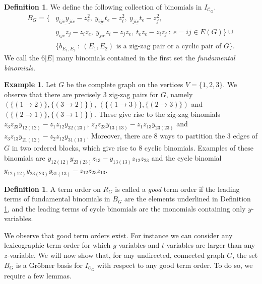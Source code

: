 \documentclass[11pt]{article}
\theoremstyle{definition}
\newtheorem{defi}[theo]{Definition}
\newtheorem{example}[theo]{Example}
\numberwithin{equation}{section}
\begin{document}
\begin{defi}\label{def: basis}
	We define the following collection of binomials in $I_{\mathcal{C}_G}$.
	\begin{align*}
		B_G=\{& \underline{y_{ije}y_{jie}}-z_e^2,~ \underline{y_{ije}t_{e}}-z_i^2,~  \underline{y_{jie}t_{e}}-z_j^2,\\
		& \underline{y_{ije}z_j} - z_iz_e,~ \underline{y_{jie}z_i} - z_jz_e,~ \underline{t_{e}z_e} - z_iz_j ~:~ e=ij\in E(G)\} \cup\\
		& \{b_{E_1,E_2} ~ : ~ (E_1,E_2) \text{ is a zig-zag pair or a cyclic pair of $G$}\}.
	\end{align*}
	We call the $6|E|$ many binomials contained in the first set the \emph{fundamental binomials}.
\end{defi}
\begin{example}
    Let $G$ be the complete graph on the vertices $V=\{1,2,3\}$. We observe that there are precisely $3$ zig-zag pairs for $G$, namely $(\{(1\to 2)\},\{(3\to 2)\})$, $(\{(1\to 3)\},\{(2\to 3)\})$ and $(\{(2\to 1)\},\{(3\to 1)\})$. These give rise to the zig-zag binomials $z_{3}z_{23}y_{12(12)}-z_{1}z_{12}y_{32(23)}$, $z_{2}z_{23}y_{13(13)}-z_{1}z_{13}y_{23(23)}$ and $z_{3}z_{13}y_{21(12)}-z_{2}z_{12}y_{31(13)}$. Moreover, there are 8 ways to partition the $3$ edges of $G$ in two ordered blocks, which give rise to $8$ cyclic binomials. Examples of these binomials are $y_{12(12)}y_{23(23)}z_{13}-y_{13(13)}z_{12}z_{23}$ and the cycle binomial $y_{12(12)}y_{23(23)}y_{31(13)}-z_{12}z_{23}z_{13}$.
\end{example}
\begin{defi}\label{def : good}
    A term order on $R_G$ is called a \emph{good} term order if the leading terms of fundamental binomials in $B_G$ are the elements underlined in Definition \ref{def: basis}, and the leading terms of cycle binomials are the monomials containing only $y$-variables.
\end{defi}
We observe that good term orders exist. 
For instance we can consider any lexicographic term order for which $y$-variables and $t$-variables are larger than any $z$-variable.
We will now show that, for any undirected, connected graph $G$, the set $B_G$ is a Gr\"obner basis for $I_{\mathcal{C}_G}$ with respect to any good term order. 
To do so, we require a few lemmas. 
\end{document}
